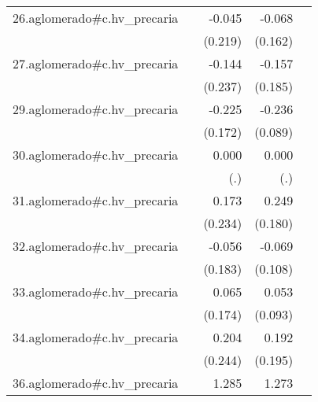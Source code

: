 {\begin{longtable}{l*{4}{D{.}{.}{-1}}}
\addlinespace
26.aglomerado#c.hv\_precaria&                     &      -0.045         &      -0.068         &                     \\
            &                     &     (0.219)         &     (0.162)         &                     \\
\addlinespace
27.aglomerado#c.hv\_precaria&                     &      -0.144         &      -0.157         &                     \\
            &                     &     (0.237)         &     (0.185)         &                     \\
\addlinespace
29.aglomerado#c.hv\_precaria&                     &      -0.225         &      -0.236\sym{**} &                     \\
            &                     &     (0.172)         &     (0.089)         &                     \\
\addlinespace
30.aglomerado#c.hv\_precaria&                     &       0.000         &       0.000         &                     \\
            &                     &         (.)         &         (.)         &                     \\
\addlinespace
31.aglomerado#c.hv\_precaria&                     &       0.173         &       0.249         &                     \\
            &                     &     (0.234)         &     (0.180)         &                     \\
\addlinespace
32.aglomerado#c.hv\_precaria&                     &      -0.056         &      -0.069         &                     \\
            &                     &     (0.183)         &     (0.108)         &                     \\
\addlinespace
33.aglomerado#c.hv\_precaria&                     &       0.065         &       0.053         &                     \\
            &                     &     (0.174)         &     (0.093)         &                     \\
\addlinespace
34.aglomerado#c.hv\_precaria&                     &       0.204         &       0.192         &                     \\
            &                     &     (0.244)         &     (0.195)         &                     \\
\addlinespace
36.aglomerado#c.hv\_precaria&                     &       1.285         &       1.273\sym{*}  &                     \\

\end{longtable}}

